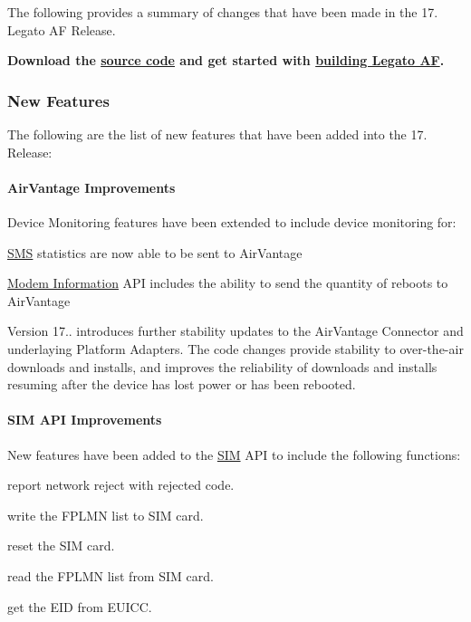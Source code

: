 The following provides a summary of changes that have been made in the 17. Legato AF Release.

{\bfseries  Download the \hyperlink{aboutReleaseInfo}{source code} and get started with \hyperlink{basicBuild}{building Legato AF}. }\hypertarget{releaseNotes17090_rn1709_Features}{}\subsubsection{New Features}\label{releaseNotes17090_rn1709_Features}
The following are the list of new features that have been added into the 17. Release\+:\hypertarget{releaseNotes17090_rn1709_Features_AV}{}\paragraph{Air\+Vantage Improvements}\label{releaseNotes17090_rn1709_Features_AV}
Device Monitoring features have been extended to include device monitoring for\+:
\begin{DoxyItemize}
\item \hyperlink{c_sms}{S\+MS} statistics are now able to be sent to Air\+Vantage
\item \hyperlink{c_info}{Modem Information} A\+PI includes the ability to send the quantity of reboots to Air\+Vantage
\end{DoxyItemize}

Version 17.. introduces further stability updates to the Air\+Vantage Connector and underlaying Platform Adapters. The code changes provide stability to over-\/the-\/air downloads and installs, and improves the reliability of downloads and installs resuming after the device has lost power or has been rebooted.\hypertarget{releaseNotes17090_rn1709_Features_SIM}{}\paragraph{S\+I\+M A\+P\+I Improvements}\label{releaseNotes17090_rn1709_Features_SIM}
New features have been added to the \hyperlink{c_sim}{S\+IM} A\+PI to include the following functions\+:
\begin{DoxyItemize}
\item report network reject with rejected code.
\item write the F\+P\+L\+MN list to S\+IM card.
\item reset the S\+IM card.
\item read the F\+P\+L\+MN list from S\+IM card.
\item get the E\+ID from E\+U\+I\+CC.
\end{DoxyItemize}

